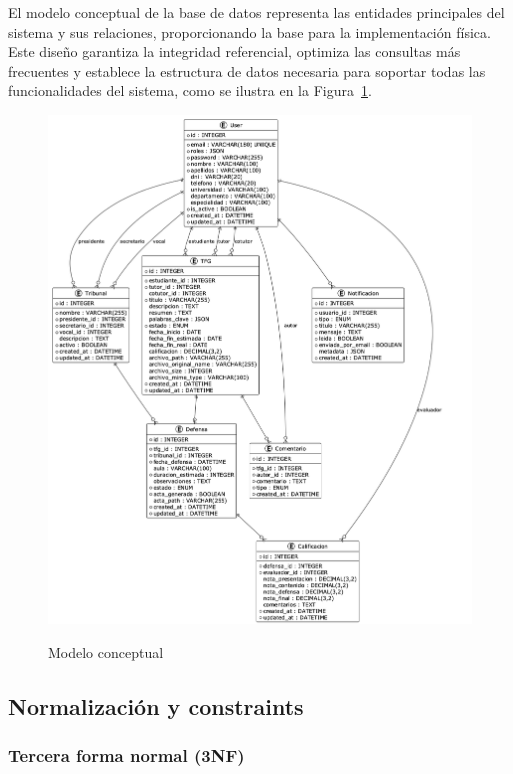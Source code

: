 \documentclass[12pt,a4paper,oneside]{report}
\providecommand{\pandocbounded}[1]{#1}
\begin{document}
El modelo conceptual de la base de datos representa las entidades principales del sistema y sus relaciones, proporcionando la base para la implementación física. Este diseño garantiza la integridad referencial, optimiza las consultas más frecuentes y establece la estructura de datos necesaria para soportar todas las funcionalidades del sistema, como se ilustra en la Figura~\ref{fig:modelo-conceptual}.

\begin{figure}[H]
\centering
\pandocbounded{\includegraphics[keepaspectratio,alt={Modelo conceptual}]{processed/images/05_diseno_plantuml_3.png}}
\caption{Modelo conceptual}
\label{fig:modelo-conceptual}
\end{figure}

\subsection{Normalización y
constraints}\label{normalizaciuxf3n-y-constraints}

\subsubsection{Tercera forma normal
(3NF)}\label{tercera-forma-normal-3nf}
\end{document}
